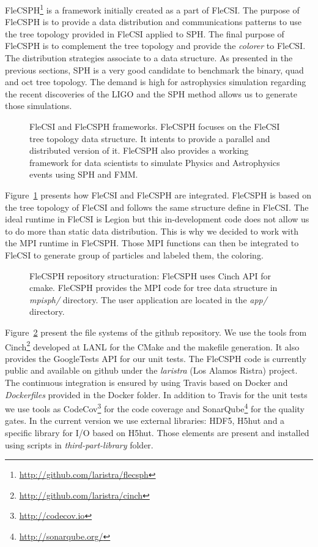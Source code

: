 FleCSPH\footnote{\url{http://github.com/laristra/flecsph}} is a framework initially created as a part of FleCSI. 
The purpose of FleCSPH is to provide a data distribution and communications patterns to use the tree topology provided in FleCSI applied to SPH.
The final purpose of FleCSPH is to complement the tree topology and provide the \textit{colorer} to FleCSI. 
The distribution strategies associate to a data structure.
As presented in the previous sections, SPH is a very good candidate to benchmark the binary, quad and oct tree topology. 
The demand is high for astrophysics simulation regarding the recent discoveries of the LIGO and the SPH method allows us to generate those simulations. 
\begin{figure}[t!]
\centering

\caption[FleCSI and FleCSPH framework]{FleCSI and FleCSPH frameworks. FleCSPH focuses on the FleCSI tree topology data structure. It intents to provide a parallel and distributed version of it. FleCSPH also provides a working framework for data scientists to simulate Physics and Astrophysics events using SPH and FMM.}
\label{fig:flecsi_flecsph_framework}
\end{figure}
Figure~\ref{fig:flecsi_flecsph_framework} presents how FleCSI and FleCSPH are integrated. 
FleCSPH is based on the tree topology of FleCSI and follows the same structure define in FleCSI. 
The ideal runtime in FleCSI is Legion but this in-development code does not allow us to do more than static data distribution. 
This is why we decided to work with the MPI runtime in FleCSPH. 
Those MPI functions can then be integrated to FleCSI to generate group of particles and labeled them, the coloring. 

\begin{figure}[t!]
\centering

\caption[FleCSPH repository structuration]{FleCSPH repository structuration: FleCSPH uses Cinch API for cmake. FleCSPH provides the MPI code for tree data structure in \textit{mpisph/} directory. The user application are located in the \textit{app/} directory.}
\label{fig:files_flecsph}
\end{figure}

Figure~\ref{fig:files_flecsph} present the file systems of the github repository. 
We use the tools from Cinch\footnote{\url{http://github.com/laristra/cinch}} developed at LANL for the CMake and the makefile generation. 
It also provides the GoogleTests API for our unit tests. 
The FleCSPH code is currently public and available on github under the \textit{laristra} (Los Alamos Ristra) project.
The continuous integration is ensured by using Travis based on Docker and \textit{Dockerfiles} provided in the Docker folder. 
In addition to Travis for the unit tests we use tools as CodeCov\footnote{\url{http://codecov.io}} for the code coverage and SonarQube\footnote{\url{http://sonarqube.org/}} for the quality gates. 
In the current version we use external libraries: HDF5, H5hut and a specific library for I/O based on H5hut. 
Those elements are present and installed using scripts in \textit{third-part-library} folder. 

